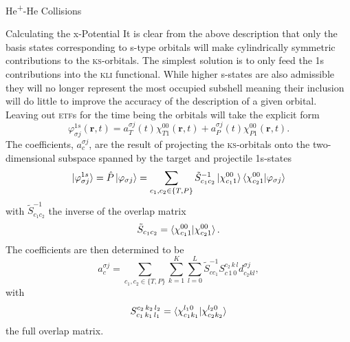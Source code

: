 \documentclass[letterpaper, 11 pt]{report}
\begin{document}
\begin{chapter}{\texorpdfstring{He\textsuperscript{+}}{He+}-He Collisions \label{chap:hephe}}
\begin{section}{Calculating the x-Potential \label{sec:pot}}
      It is clear from the above description that only the basis states corresponding to s-type orbitals
      will make cylindrically symmetric contributions to the \textsc{ks}-orbitals. The simplest solution
      is to only feed the 1s contributions into the \textsc{kli} functional. While higher s-states are
      also admissible they will no longer represent the most occupied subshell meaning their inclusion
      will do little to improve the accuracy of the description of a given orbital. Leaving out
      \textsc{etf}s for the time being the orbitals will take the explicit form
      \begin{equation} \label{eq:1sonly}
         \varphi_{\sigma j}^{1s}(\mathbf{r},t) = a^{\sigma j}_T(t) \chi^{00}_{T1}(\mathbf{r},t)
                                               + a^{\sigma j}_P(t) \chi^{00}_{P1}(\mathbf{r},t).
      \end{equation}
      The coefficients, $a^{\sigma j}_c$, are the result of projecting the \textsc{ks}-orbitals onto the
      two-dimensional subspace spanned by the target and projectile 1s-states
      \begin{equation} \label{eq:proj}
         \ket{\varphi^{1s}_{\sigma j}} = \hat{P} \ket{\varphi_{\sigma j}}
                                       = \sum\limits_{c_1, c_2 \in \{T,P\}} \tilde{S}^{-1}_{c_1 c_2}
                                                      \ket{\chi^{00}_{c_1 1}}
                                                      \braket{\chi^{00}_{c_2 1}| \varphi_{\sigma j}}
      \end{equation}
      with $\tilde{S}^{-1}_{c_1 c_2}$ the inverse of the overlap matrix
      \begin{equation} \label{eq:overlap2d}
         \tilde{S}_{c_1 c_2} = \braket{ \chi^{00}_{c_1 1} | \chi^{00}_{c_2 1} }.
      \end{equation}
      The coefficients are then determined to be
      \begin{equation} \label{eq:coef}
         a^{\sigma j}_c = \sum\limits_{c_1, c_2 \in \{T,P\}} \sum\limits_{k = 1}^K
                          \sum\limits_{l = 0}^L \tilde{S}^{-1}_{c c_1} S^{c_2 \, k \, l}_{c \, 1 \, 0}
                             d^{\sigma j}_{c_2 k l},
      \end{equation}
      with
      \begin{equation} \label{eq:overlap}
         S_{c_1 \, k_1 \, l_1 }^{c_2 \, k_2 \, l_2 } =
            \braket{ \chi^{l_1 0}_{c_1 k_1} | \chi^{l_2 0}_{c_2 k_2} }
      \end{equation}
      the full overlap matrix.


\end{section}
\end{chapter}
\end{document}
